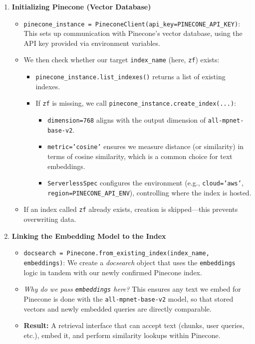 \begin{enumerate}
    \item \textbf{Initializing Pinecone (Vector Database)}
    \begin{itemize}
        \item \texttt{pinecone\_instance = PineconeClient(api\_key=PINECONE\_API\_KEY)}: 
        This sets up communication with Pinecone’s vector database, using the API key provided via environment variables.
        \item We then check whether our target \texttt{index\_name} (here, \texttt{zf}) exists:
        \begin{itemize}
            \item \texttt{pinecone\_instance.list\_indexes()} returns a list of existing indexes.
            \item If \texttt{zf} is missing, we call \texttt{pinecone\_instance.create\_index(...)}:
            \begin{itemize}
                \item \texttt{dimension=768} aligns with the output dimension of \texttt{all-mpnet-base-v2}.
                \item \texttt{metric='cosine'} ensures we measure distance (or similarity) in terms of cosine similarity, which is a common choice for text embeddings.
                \item \texttt{ServerlessSpec} configures the environment (e.g., \texttt{cloud='aws'}, \texttt{region=PINECONE\_API\_ENV}), controlling where the index is hosted.
            \end{itemize}
        \end{itemize}
        \item If an index called \texttt{zf} already exists, creation is skipped—this prevents overwriting data.
    \end{itemize}

    \item \textbf{Linking the Embedding Model to the Index}
    \begin{itemize}
        \item \texttt{docsearch = Pinecone.from\_existing\_index(index\_name, embeddings)}: 
        We create a \emph{docsearch} object that uses the \texttt{embeddings} logic in tandem with our newly confirmed Pinecone index.
        \item \emph{Why do we pass \texttt{embeddings} here?}  
        This ensures any text we embed for Pinecone is done with the \texttt{all-mpnet-base-v2} model, so that stored vectors and newly embedded queries are directly comparable.
        \item \textbf{Result:} A retrieval interface that can accept text (chunks, user queries, etc.), embed it, and perform similarity lookups within Pinecone.
    \end{itemize}
\end{enumerate}

